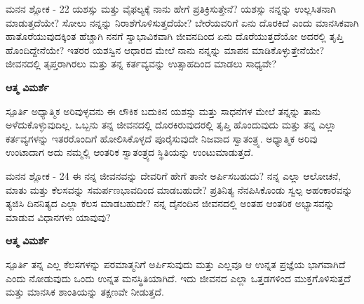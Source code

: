 \newpage
\begin{mananam}{\mananamfont ಮನನ ಶ್ಲೋಕ - \textenglish{22}}
\footnotesize \mananamtext ಯಶಸ್ಸು ಮತ್ತು ವೈಫಲ್ಯಕ್ಕೆ ನಾನು ಹೇಗೆ ಪ್ರತಿಕ್ರಿಸುತ್ತೇನೆ? ಯಶಸ್ಸು ನನ್ನನ್ನು ಉಲ್ಲಸಿತನಾಗಿ ಮಾಡುತ್ತದೆಯೇ? ಸೋಲು ನನ್ನನ್ನು ನಿರಾಶೆಗೊಳಿಸುತ್ತದೆಯೇ? ಬೇರೆಯವರಿಗೆ ಏನು ದೊರಕಿದೆ ಎಂದು ಮಾನಸಿಕವಾಗಿ ಹಾತೊರೆಯುವುದಕ್ಕಿಂತ ಹೆಚ್ಚಾಗಿ ನನಗೆ ಸ್ವಾಭಾವಿಕವಾಗಿ ಜೀವನದಿಂದ ಏನು ದೊರೆಯುತ್ತದೆಯೋ ಅದರಲ್ಲಿ ತೃಪ್ತಿ ಹೊಂದಿದ್ದೇನೆಯೇ? ಇತರರ ಯಶಸ್ವಿನ ಆಧಾರದ ಮೇಲೆ ನಾನು ನನ್ನನ್ನು ಮಾಪನ ಮಾಡಿಕೊಳ್ಳುತ್ತೇನೆಯೇ? ಜೀವನದಲ್ಲಿ ತೃಪ್ತರಾಗಿರಲು ಮತ್ತು ತನ್ನ ಕರ್ತವ್ಯವನ್ನು ಉತ್ಸಾಹದಿಂದ ಮಾಡಲು ಸಾಧ್ಯವೇ?
\end{mananam}
\WritingHand\enspace\textbf{ಆತ್ಮ ವಿಮರ್ಶೆ}\\
\begin{inspiration}{\mananamfont ಸ್ಪೂರ್ತಿ}
\footnotesize \mananamtext ಅಧ್ಯಾತ್ಮಿಕ ಅರಿವುಳ್ಳವನು ಈ ಲೌಕಿಕ ಬದುಕಿನ ಯಶಸ್ಸು ಮತ್ತು ಸಾಧನೆಗಳ ಮೇಲೆ ತನ್ನನ್ನು ತಾನು ಅಳೆದುಕೊಳ್ಳುವುದಿಲ್ಲ. ಒಬ್ಬನು ತನ್ನ ಜೀವನದಲ್ಲಿ ದೊರಕಿರುವುದರಲ್ಲಿ ತೃಪ್ತಿ ಹೊಂದುವುದು ಮತ್ತು ತನ್ನ ಎಲ್ಲಾ ಕರ್ತವ್ಯಗಳನ್ನು ಇತರರೊಂದಿಗೆ ಹೋಲಿಸಿಕೊಳ್ಳದೆ ಪೂರೈಸುವುದೇ ನಿಜವಾದ ಸ್ವಾತಂತ್ರ್ಯ.  ಅಧ್ಯಾತ್ಮಿಕ  ಅರಿವು ಉಂಟಾದಾಗ ಅದು ನಮ್ಮಲ್ಲಿ ಆಂತರಿಕ ಸ್ವಾತಂತ್ರ್ಯದ ಸ್ಥಿತಿಯನ್ನು ಉಂಟುಮಾಡುತ್ತದೆ. 
\end{inspiration}
\newpage


\newpage
\begin{mananam}{\mananamfont ಮನನ ಶ್ಲೋಕ - \textenglish{24}}
\footnotesize \mananamtext ಈ ನನ್ನ ಜೀವನವನ್ನು ದೇವರಿಗೆ ಹೇಗೆ ತಾನೇ ಅರ್ಪಿಸಬಹುದು? ನನ್ನ ಎಲ್ಲಾ ಆಲೋಚನೆ, ಮಾತು ಮತ್ತು ಕೆಲಸವನ್ನು ಸಮರ್ಪಣಭಾವದಿಂದ ಮಾಡಬಹುದೇ? ಪ್ರತಿನಿತ್ಯ ನೆನಪಿಸಿಕೊಂಡು ಸ್ವಲ್ಪ ಅಹಂಕಾರವನ್ನು ತ್ಯಜಿಸಿ ದಿನನಿತ್ಯದ ಎಲ್ಲಾ ಕೆಲಸ ಮಾಡಬಹುದೇ? ನನ್ನ ದೈನಂದಿನ ಜೀವನದಲ್ಲಿ ಅಂತಹ ಆಂತರಿಕ ಅಭ್ಯಾಸವನ್ನು ಮಾಡುವ ವಿಧಾನಗಳು ಯಾವುವು?
\end{mananam}
\WritingHand\enspace\textbf{ಆತ್ಮ ವಿಮರ್ಶೆ}\\
\begin{inspiration}{\mananamfont ಸ್ಪೂರ್ತಿ}
\footnotesize \mananamtext ತನ್ನ ಎಲ್ಲ ಕೆಲಸಗಳನ್ನು ಪರಮಾತ್ಮನಿಗೆ ಅರ್ಪಿಸುವುದು ಮತ್ತು ಎಲ್ಲವೂ ಆ ಉನ್ನತ ಪ್ರಜ್ಞೆಯ ಭಾಗವಾಗಿದೆ ಎಂದು ನೋಡುವುದು ಒಂದು ಉನ್ನತ ಮನಸ್ಥಿತಿಯಾಗಿದೆ. ಇದು ಜೀವನದ ಎಲ್ಲಾ ಒತ್ತಡಗಳಿಂದ ಮುಕ್ತಗೊಳಿಸುತ್ತದೆ ಮತ್ತು ಮಾನಸಿಕ ಶಾಂತಿಯನ್ನು ತಕ್ಷಣವೇ ನೀಡುತ್ತದೆ.
\end{inspiration}
\newpage

